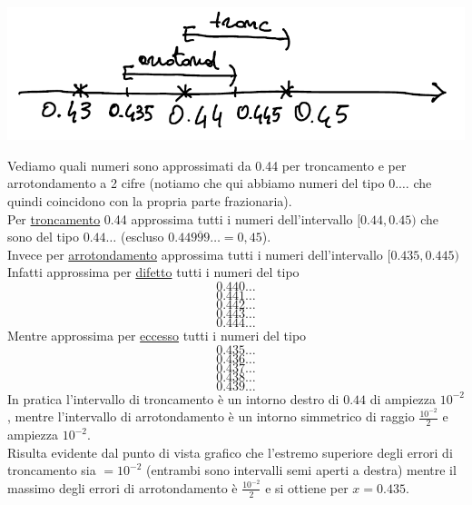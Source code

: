\begin{center}
    \includegraphics[scale=0.65]{foto/img1}
\end{center}
Vediamo quali numeri sono approssimati da 0.44 per troncamento e per arrotondamento a 2 cifre (notiamo che qui abbiamo numeri del tipo $0.\dotsc$ che quindi coincidono con la propria parte frazionaria).\\
Per \uline{troncamento} 0.44 approssima tutti i numeri dell'intervallo $[0.44 , 0.45)$ che sono del tipo $0.44\dotsc$ (escluso $0.44\overline{999}\dotsc = 0,45$).\\
Invece per \uline{arrotondamento} approssima tutti i numeri dell'intervallo $[0.435 , 0.445)$ \\ 
Infatti approssima per \uline{difetto} tutti i numeri del tipo \[ 0.440\dotsc \] \[ 0.441\dotsc \] \[ 0.442\dotsc \] \[ 0.443\dotsc \] \[ 0.444\dotsc \]
Mentre approssima per \uline{eccesso} tutti i numeri del tipo \[ 0.435\dotsc \] \[ 0.436\dotsc \] \[ 0.437\dotsc \] \[ 0.438\dotsc \] \[ 0.439\dotsc \]
In pratica l'intervallo di troncamento è un intorno destro di $0.44$ di ampiezza $10^{-2}$, mentre l'intervallo di arrotondamento è un intorno simmetrico di raggio $\frac{10^{-2}}{2}$ e ampiezza $10^{-2}$.\\
Risulta evidente dal punto di vista grafico che l'estremo superiore degli errori di troncamento sia $= 10^{-2}$ (entrambi sono intervalli semi aperti a destra) mentre il massimo degli errori di arrotondamento è $\frac{10^{-2}}{2}$ e si ottiene per $x = 0.435$.
\newpage